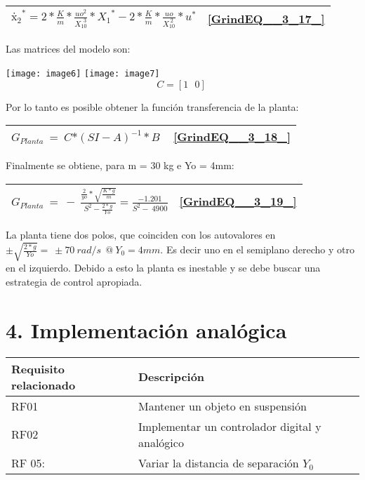 \documentclass{article} %
\begin{document}
\begin{tabular}{|p{3.9in}|p{0.5in}|} \hline 
${{\textrm{ẋ}}_2}^*=2*\frac{K}{m}*\frac{uo^2}{X^{\ \ 3}_{10}}*{{X_1}^*}-2*\frac{K}{m}*\frac{uo}{X^{\ 2}_{10}}*u^*$ & \eqref{GrindEQ__3_17_}  \\ \hline 
\end{tabular}

Las matrices del modelo son:

\noindent 

\noindent \texttt{[image: image6]}     \texttt{[image: image7]}
\[C=[1\ \ \ 0]\ \] 


\noindent Por lo tanto es posible obtener la funci\'{o}n transferencia de la planta:

\noindent 

\begin{tabular}{|p{3.9in}|p{0.4in}|} \hline 
$G_{Planta}\ =\ C{*(SI-A)}^{-1}*B\ $ & \eqref{GrindEQ__3_18_}  \\ \hline 
\end{tabular}



\noindent Finalmente se obtiene, para m = 30 kg e Yo = 4mm:

\noindent 

\begin{tabular}{|p{3.9in}|p{0.4in}|} \hline 
$G_{Planta}\ =\ -\ \frac{\frac{2}{yo}*\sqrt{\frac{K*g}{m}}}{S^2-\frac{2*g}{Yo}}=\frac{-1.201}{S^2-\ 4900}$ & \eqref{GrindEQ__3_19_}  \\ \hline 
\end{tabular}



\noindent La planta tiene dos polos, que coinciden con los autovalores en $\pm \sqrt{\frac{2*g}{Yo}}=\ \pm 70\ rad/s\ \ @\ Y_0=4mm$.  Es decir uno en el semiplano derecho y otro en el izquierdo. Debido a esto la planta es inestable y se debe buscar una estrategia de control apropiada.

\noindent 

\noindent 
\section{4. Implementaci\'{o}n anal\'{o}gica}

\begin{tabular}{|p{2.1in}|p{2.1in}|} \hline 
Requisito relacionado & Descripci\'{o}n \\ \hline 
RF01 & Mantener un objeto en suspensi\'{o}n \\ \hline 
RF02 & Implementar un controlador digital y anal\'{o}gico \\ \hline 
RF 05:  & Variar la distancia de separaci\'{o}n $Y_0$\newline  \\ \hline 
\end{tabular}
\end{document}
